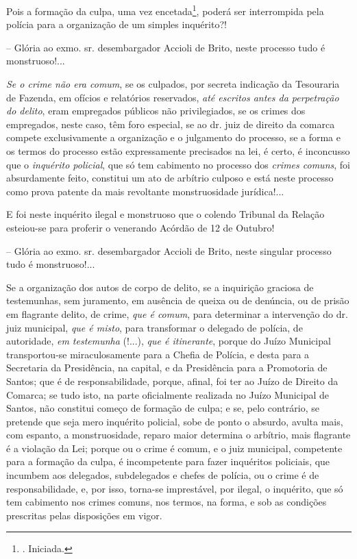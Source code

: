 Pois a formação da culpa, uma vez encetada\footnote{. Iniciada.}, poderá
ser interrompida pela polícia para a organização de um simples
inquérito?!

-- Glória ao exmo. sr. desembargador Accioli de Brito, neste processo
tudo é monstruoso!...

\emph{Se o crime não era comum}, se os culpados, por secreta indicação
da Tesouraria de Fazenda, em ofícios e relatórios reservados, \emph{até
escritos antes da perpetração do delito}, eram empregados públicos não
privilegiados, se os crimes dos empregados, neste caso, têm foro
especial, se ao dr. juiz de direito da comarca compete exclusivamente a
organização e o julgamento do processo, se a forma e os termos do
processo estão expressamente precisados na lei, é certo, é inconcusso
que o \emph{inquérito policial}, que só tem cabimento no processo dos
\emph{crimes comuns}, foi absurdamente feito, constitui um ato de
arbítrio culposo e está neste processo como prova patente da mais
revoltante monstruosidade jurídica!...

E foi neste inquérito ilegal e monstruoso que o colendo Tribunal da
Relação esteiou-se para proferir o venerando Acórdão de 12 de Outubro!

-- Glória ao exmo. sr. desembargador Accioli de Brito, neste singular
processo tudo é monstruoso!...

Se a organização dos autos de corpo de delito, se a inquirição graciosa
de testemunhas, sem juramento, em ausência de queixa ou de denúncia, ou
de prisão em flagrante delito, de crime, \emph{que é comum}, para
determinar a intervenção do dr. juiz municipal, \emph{que é misto}, para
transformar o delegado de polícia, de autoridade, \emph{em testemunha}
(!...), \emph{que é itinerante}, porque do Juízo Municipal
transportou-se miraculosamente para a Chefia de Polícia, e desta para a
Secretaria da Presidência, na capital, e da Presidência para a
Promotoria de Santos; que é de responsabilidade, porque, afinal, foi ter
ao Juízo de Direito da Comarca; se tudo isto, na parte oficialmente
realizada no Juízo Municipal de Santos, não constitui começo de formação
de culpa; e se, pelo contrário, se pretende que seja mero inquérito
policial, sobe de ponto o absurdo, avulta mais, com espanto, a
monstruosidade, reparo maior determina o arbítrio, mais flagrante é a
violação da Lei; porque ou o crime é comum, e o juiz municipal,
competente para a formação da culpa, é incompetente para fazer
inquéritos policiais, que incumbem aos delegados, subdelegados e chefes
de polícia, ou o crime é de responsabilidade, e, por isso, torna-se
imprestável, por ilegal, o inquérito, que só tem cabimento nos crimes
comuns, nos termos, na forma, e sob as condições prescritas pelas
disposições em vigor.

